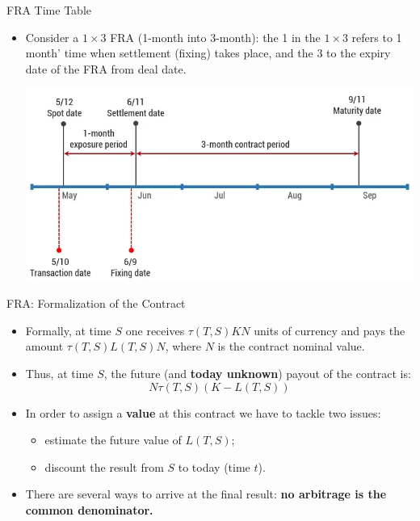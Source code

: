 \documentclass{beamer}
\begin{document}
\begin{frame}{FRA Time Table}
	\begin{itemize}
		\item Consider a $1\times 3$ FRA (1-month into 3-month): the 1 in the $1\times 3$ refers to 1 month' time when settlement (fixing) takes place, and the 3 to the expiry date of the FRA from deal date.
	\begin{center}
		\includegraphics[width=0.8\linewidth]{images/fra_timeline}
	\end{center}
\end{itemize}
\end{frame}

\begin{frame}{FRA: Formalization of the Contract}
	\begin{itemize}
		\item<1-> Formally, at time $S$ one receives $\tau(T, S)KN$ units of currency and pays the amount $\tau(T,S)L(T,S)N$, where $N$ is the contract nominal value.
		\item<2-> Thus, at time $S$, the future (and \textbf{today unknown}) payout of the contract is: 
		\begin{equation}
			N\tau(T,S)(K-L(T,S))
			\label{eq:fra_payoff}
		\end{equation}
		\item<3-> In order to assign a \textbf{value} at this contract we have to tackle two issues:
		\begin{itemize}
			\item<3-> estimate the future value of $L(T, S)$;
			\item<3-> discount the result from $S$ to today (time $t$).
		\end{itemize}
		\item<4-> There are several ways to arrive at the final result: \textbf{no arbitrage is the common denominator.}
	\end{itemize}
\end{frame}
\end{document}
